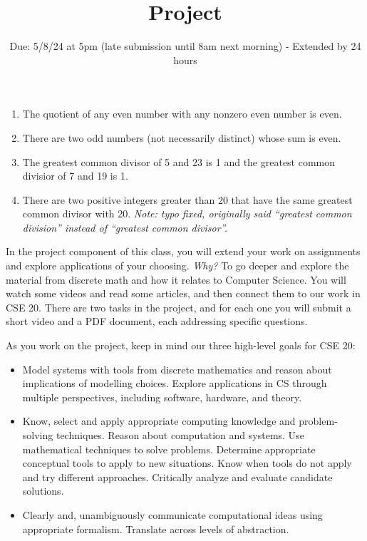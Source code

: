 \begin{enumerate}[labelindent=0pt, leftmargin=0pt]
        \begin{enumerate}
            \item The quotient of any even number with any nonzero even number is even.
            \item There are two odd numbers (not necessarily distinct) whose sum is even.
            \item The greatest common divisor of 5 and 23 is 1 and the greatest common divisior of 7 and 19 is 1.
            \item There are two positive integers greater than 20 that have the same greatest common divisor with 20. {\it Note: typo fixed, 
            originally said ``greatest common division'' instead of ``greatest common divisor''.}
        \end{enumerate}
    \end{enumerate}

\newpage

\setlength{\parindent}{0em}
\setlength{\parskip}{0em}

\title{Project}
\date{Due: 5/8/24 at 5pm (late submission until 8am next morning) - Extended by 24 hours}


\maketitle
\thispagestyle{fancy}

\vspace{-20pt}

In the project component of this class, you will extend your 
work on assignments and explore applications of your choosing. 
{\it Why?}
To go deeper and explore the material from discrete math and how it relates to Computer Science.
You will watch some videos and read some articles, and then connect them to our work in CSE 20. There 
are two tasks in the project, and for each one you will submit a short video and a PDF document, each 
addressing specific questions.


As you work on the project, keep in mind our three high-level goals for CSE 20:
\begin{itemize}
\item Model systems with tools from discrete mathematics and reason about implications 
of modelling choices. Explore applications in CS through multiple perspectives, including software, hardware, and theory.
\item Know, select and apply appropriate computing knowledge and problem-solving techniques. Reason about computation and systems. Use mathematical techniques to solve problems. Determine appropriate conceptual tools to apply to new situations. Know when tools do not apply and try different approaches. Critically analyze and evaluate candidate solutions.
\item Clearly and, unambiguously communicate computational ideas using appropriate formalism. Translate across levels of abstraction.
\end{itemize}


